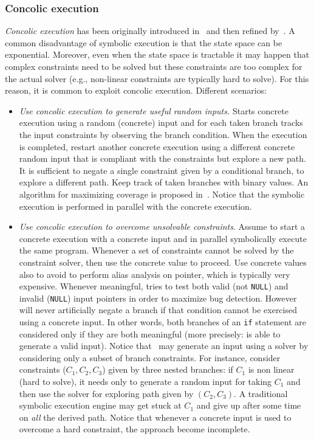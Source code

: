 \documentclass[10pt, a4paper]{article}
\begin{document}
\subsubsection{Concolic execution}
\label{concolic-execution}

{\em Concolic execution} has been originally introduced in~\cite{DART-PLDI05} and then refined by~\cite{CUTE-FSE13}. A common disadvantage of symbolic execution is that the state space can be exponential. Moreover, even when the state space is tractable it may happen that complex constraints need to be solved but these constraints are too complex for the actual solver (e.g., non-linear constraints are typically hard to solve). For this reason, it is common to exploit concolic execution. Different scenarios:
\begin{itemize}
  \item {\em Use concolic execution to generate useful random inputs.} Starts concrete execution using a random (concrete) input and for each taken branch tracks the input constraints by observing the branch condition. When the execution is completed, restart another concrete execution using a different concrete random input that is compliant with the constraints but explore a new path. It is sufficient to negate a single constraint given by a conditional branch, to explore a different path. Keep track of taken branches with binary values. An algorithm for maximizing coverage is proposed in~\cite{DART-PLDI05}. Notice that the symbolic execution is performed in parallel with the concrete execution.
  \item {\em Use concolic execution to overcome unsolvable constraints}. Assume to start a concrete execution with a concrete input and in parallel symbolically execute the same program. Whenever a set of constraints cannot be solved by the constraint solver, then use the concrete value to proceed. Use concrete values also to avoid to perform alias analysis on pointer, which is typically very expensive. Whenever meaningful, \cite{DART-PLDI05} tries to test both valid (not {\tt NULL}) and invalid ({\tt NULL}) input pointers in order to maximize bug detection. However~\cite{DART-PLDI05} will never artificially negate a branch if that condition cannot be exercised using a concrete input. In other words, both branches of an {\tt if} statement are considered only if they are both meaningful (more precisely: \cite{DART-PLDI05} is able to generate a valid input). Notice that~\cite{DART-PLDI05} may generate an input using a solver by considering only a subset of branch constraints. For instance, consider constraints ($C_1, C_2, C_3$) given by three nested branches: if $C_1$ is non linear (hard to solve), it needs only to generate a random input for taking $C_1$ and then use the solver for exploring path given by $(C_2, C_3)$. A traditional symbolic execution engine may get stuck at $C_1$ and give up after some time on {\em all} the derived path. Notice that whenever a concrete input is used to overcome a hard constraint, the approach become incomplete.
\end{itemize} 
\end{document}
